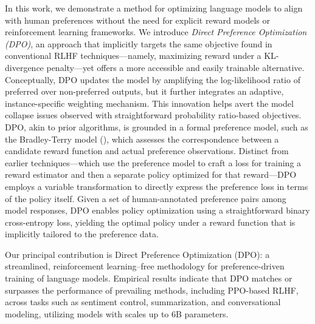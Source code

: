 In this work, we demonstrate a method for optimizing language models to align with human preferences without the need for explicit reward models or reinforcement learning frameworks. We introduce \textit{{Direct Preference Optimization} (DPO)}, an approach that implicitly targets the same objective found in conventional RLHF techniques—namely, maximizing reward under a KL-divergence penalty—yet offers a more accessible and easily trainable alternative. Conceptually, DPO updates the model by amplifying the log-likelihood ratio of preferred over non-preferred outputs, but it further integrates an adaptive, instance-specific weighting mechanism. This innovation helps avert the model collapse issues observed with straightforward probability ratio-based objectives. DPO, akin to prior algorithms, is grounded in a formal preference model, such as the Bradley-Terry model (\cite{bradley1952rankanalysis}), which assesses the correspondence between a candidate reward function and actual preference observations. Distinct from earlier techniques—which use the preference model to craft a loss for training a reward estimator and then a separate policy optimized for that reward—DPO employs a variable transformation to directly express the preference loss in terms of the policy itself. Given a set of human-annotated preference pairs among model responses, DPO enables policy optimization using a straightforward binary cross-entropy loss, yielding the optimal policy under a reward function that is implicitly tailored to the preference data.

Our principal contribution is Direct Preference Optimization (DPO): a streamlined, reinforcement learning–free methodology for preference-driven training of language models. Empirical results indicate that DPO matches or surpasses the performance of prevailing methods, including PPO-based RLHF, across tasks such as sentiment control, summarization, and conversational modeling, utilizing models with scales up to 6B parameters.

